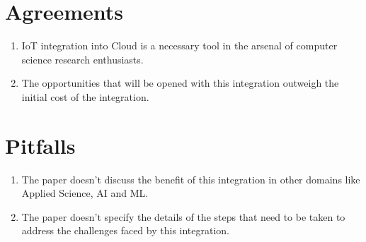 \documentclass{article}
\begin{document}
\section*{Agreements}
\begin{enumerate}
  \item IoT integration into Cloud is a necessary tool in the arsenal of computer science research enthusiasts.
  \item The opportunities that will be opened with this integration outweigh the initial cost of the integration.
\end{enumerate}

\section*{Pitfalls}
\begin{enumerate}
  \item The paper doesn’t discuss the benefit of this integration in other domains like Applied Science, AI and ML.
  \item The paper doesn’t specify the details of the steps that need to be taken to address the challenges faced by this integration.
\end{enumerate}
\end{document}
